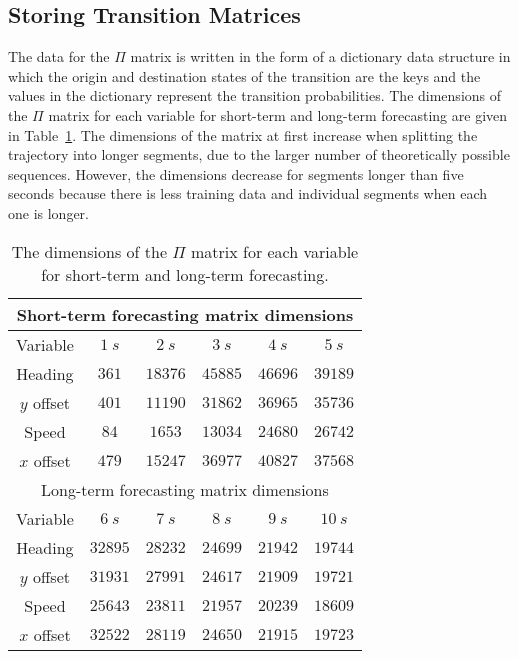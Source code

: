 \documentclass[preprint,12pt]{elsarticle}
\begin{document}
\subsection{Storing Transition Matrices}

The data for the $\Pi$ matrix is written in the form of a dictionary data structure in which the origin and destination states of the transition are the keys and the values in the dictionary represent the transition probabilities. The dimensions of the $\Pi$ matrix for each variable for short-term and long-term forecasting are given in Table~\ref{tab:dimmatr}. The dimensions of the matrix at first increase when splitting the trajectory into longer segments, due to the larger number of theoretically possible sequences. However, the dimensions decrease for segments longer than five seconds because there is less training data and individual segments when each one is longer.
 
\begin{table}[!ht]
	\centering
	\begin{tabular}{|c|c|c|c|c|c|}
		\hline
		\multicolumn{6}{|c|}{Short-term forecasting matrix dimensions} \\ \hline
		Variable & $1 \ s$ & $2 \ s$ & $3 \ s$ & $4 \ s$ & $5 \ s$ \\ \hline
        Heading & $361$ & $18376$ & $45885$ & $46696$ & $39189$ \\ \hline
        $y$ offset & $401$ & $11190$ & $31862$ & $36965$ & $35736$ \\ \hline
        Speed & $84$ & $1653$ & $13034$ & $24680$ & $26742$ \\ \hline
        $x$ offset & $479$ & $15247$ & $36977$ & $40827$ & $37568$ \\ \hline
		\multicolumn{6}{|c|}{Long-term forecasting matrix dimensions} \\ \hline
		Variable & $6 \ s$ & $7 \ s$ & $8 \ s$ & $9 \ s$ & $10 \ s$ \\ \hline
        Heading & $32895$ & $28232$ & $24699$ & $21942$ & $19744$ \\ \hline
        $y$ offset & $31931$ & $27991$ & $24617$ & $21909$ & $19721$ \\ \hline
        Speed & $25643$ & $23811$ & $21957$ & $20239$ & $18609$ \\ \hline
        $x$ offset & $32522$ & $28119$ & $24650$ & $21915$ & $19723$ \\ \hline
	\end{tabular}
	\caption{The dimensions of the $\Pi$ matrix for each variable for short-term and long-term forecasting.}
	\label{tab:dimmatr}
\end{table}
  
\end{document}
